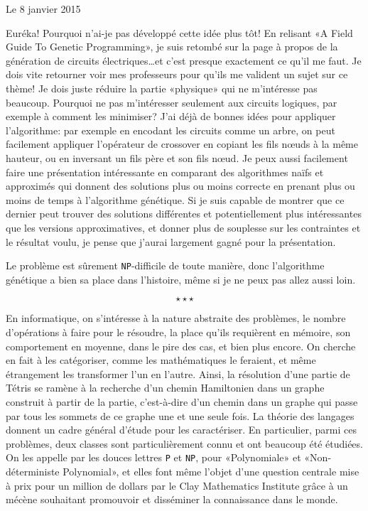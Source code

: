 \documentclass[12pt,final]{report} %
\newcommand{\stardelimiter}{
\[ \star \star \star \]
\newpage
}
\newcommand{\datemarge}[1]{%
   \newpage
   
        {\hfill{\color{blue}#1}}

}
\newcommand{\majuscule}[1]{{\large \texttt{#1}}}
\begin{document}
\begin{cursive}
{\datemarge{Le 8 janvier 2015} %

Euréka! Pourquoi n'ai-je pas développé cette idée plus tôt!
En relisant «A Field Guide To Genetic Programming», je suis retombé sur la page à propos de la génération de circuits électriques\dots et c'est presque exactement ce qu'il me faut.
Je dois vite retourner voir mes professeurs pour qu'ils me valident un sujet sur ce thème!
Je dois juste réduire la partie «physique» qui ne m'intéresse pas beaucoup.
Pourquoi ne pas m'intéresser seulement aux circuits logiques, par exemple à comment les minimiser?
J'ai déjà de bonnes idées pour appliquer l'algorithme: par exemple en encodant les circuits comme un arbre, on peut facilement appliquer l'opérateur de crossover en copiant les fils n\oe{}uds à la même hauteur, ou en inversant un fils père et son fils n\oe{}ud.
Je peux aussi facilement faire une présentation intéressante en comparant des algorithmes naïfs et approximés qui donnent des solutions plus ou moins correcte en prenant plus ou moins de temps à l'algorithme génétique.
Si je suis capable de montrer que ce dernier peut trouver des solutions différentes et potentiellement plus intéressantes que les versions approximatives, et donner plus de souplesse sur les contraintes et le résultat voulu, je pense que j'aurai largement gagné pour la présentation.

Le problème est sûrement \majuscule{NP}-difficile de toute manière, donc l'algorithme génétique a bien sa place dans l'histoire, même si je ne peux pas allez aussi loin.

\stardelimiter{}

En informatique, on s'intéresse à la nature abstraite des problèmes, le nombre d'opérations à faire pour le résoudre, la place qu'ils requièrent en mémoire, son comportement en moyenne, dans le pire des cas, et bien plus encore.
On cherche en fait à les catégoriser, comme les mathématiques le feraient, et même étrangement les transformer l'un en l'autre. 
Ainsi, la résolution d'une partie de Tétris se ramène à la recherche d'un chemin Hamiltonien dans un graphe construit à partir de la partie, c'est-à-dire d'un chemin dans un graphe qui passe par tous les sommets de ce graphe une et une seule fois.
La théorie des langages donnent un cadre général d'étude pour les caractériser.
En particulier, parmi ces problèmes, deux classes sont particulièrement connu et ont beaucoup été étudiées.
On les appelle par les douces lettres \majuscule{P} et \majuscule{NP}, pour «Polynomiale» et «Non-déterministe Polynomial», et elles font même l'objet d'une question centrale mise à prix pour un million de dollars par le Clay Mathematics Institute grâce à un mécène souhaitant promouvoir et disséminer la connaissance dans le monde. 

}
\end{cursive}
\end{document}
